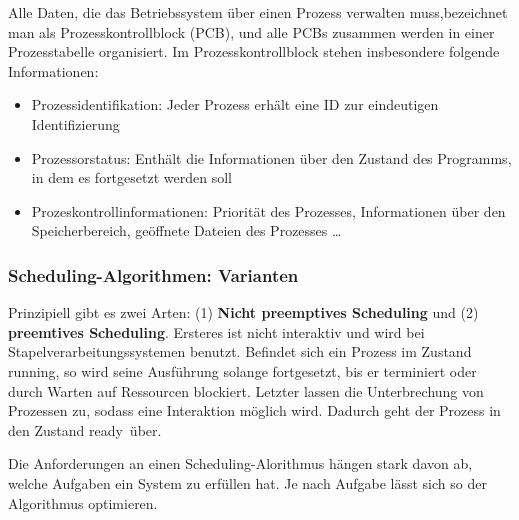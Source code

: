 Alle Daten, die das Betriebssystem über einen Prozess verwalten muss,bezeichnet man als Prozesskontrollblock (PCB), und alle PCBs zusammen werden in einer Prozesstabelle organisiert. Im Prozesskontrollblock stehen insbesondere folgende Informationen:
\begin{itemize}
	\item Prozessidentifikation: Jeder Prozess erhält eine ID zur eindeutigen Identifizierung
	\item Prozessorstatus: Enthält die Informationen über den Zustand des Programms, in dem es fortgesetzt werden soll
	\item Prozeskontrollinformationen: Priorität des Prozesses, Informationen über den Speicherbereich, geöffnete Dateien des Prozesses \dots
\end{itemize}


\subsubsection{Scheduling-Algorithmen: Varianten}

Prinzipiell gibt es zwei Arten: (1) \textbf{Nicht preemptives Scheduling} und (2) \textbf{preemtives Scheduling}. Ersteres ist nicht interaktiv und wird bei Stapelverarbeitungssystemen benutzt. Befindet sich ein Prozess im Zustand \ql running\qr, so wird seine Ausführung solange fortgesetzt, bis er terminiert oder durch Warten auf Ressourcen blockiert. Letzter lassen die Unterbrechung von Prozessen zu, sodass eine Interaktion möglich wird. Dadurch geht der Prozess in den Zustand \ql ready\qr\ über.

Die Anforderungen an einen Scheduling-Alorithmus hängen stark davon ab, welche Aufgaben ein System zu erfüllen hat. Je nach Aufgabe lässt sich so der Algorithmus optimieren.

